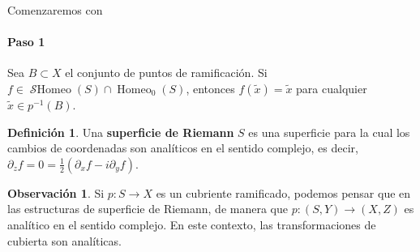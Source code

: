 \documentclass[spanish]{article}
\theoremstyle{definition}
\newtheorem*{defn}{Definición}
\newtheorem*{obs}{Observación}
\DeclareMathOperator{\Homeo}{Homeo}
\DeclareMathOperator{\SHomeo}{\mathcal{S}Homeo}
\begin{document}
Comenzaremos con
\paragraph{Paso 1} Sea $B\subset X$ el conjunto de puntos de ramificación. Si $f\in\SHomeo(S)\cap\Homeo_0(S)$, entonces $f(\tilde{x})=\tilde{x}$ para cualquier $\tilde{x}\in p^{-1}(B)$.

\begin{defn}
	Una \textbf{superficie de Riemann} $S$ es una superficie para la cual los cambios de coordenadas son analíticos en el sentido complejo, es decir, $\partial_zf=0=\frac{1}{2}(\partial_xf-i\partial_yf)$.
\end{defn}
\begin{obs}
	Si $p:S\to X$ es un cubriente ramificado, podemos pensar que en las estructuras de superficie de Riemann, de manera que $p:(S,Y)\to(X,Z)$ es analítico en el sentido complejo. En este contexto, las transformaciones de cubierta son analíticas.
\end{obs}
\end{document}
